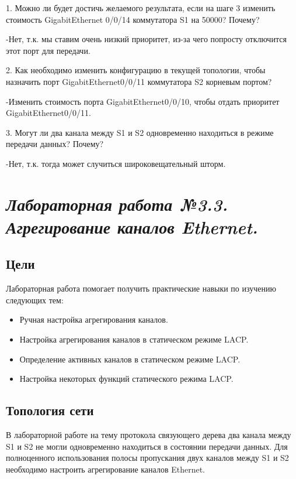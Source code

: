 1. Можно ли будет достичь желаемого результата, если на шаге 3 изменить
стоимость GigabitEthernet 0/0/14 коммутатора S1 на 50000? Почему?

-Нет, т.к. мы ставим очень низкий приоритет, из-за чего попросту отключится этот порт для передачи.

2. Как необходимо изменить конфигурацию в текущей топологии, чтобы назначить
порт GigabitEthernet0/0/11 коммутатора S2 корневым портом?

-Изменить стоимость порта GigabitEthernet0/0/10, чтобы отдать приоритет GigabitEthernet0/0/11.

3. Могут ли два канала между S1 и S2 одновременно находиться в режиме передачи
данных? Почему?

-Нет, т.к. тогда может случиться широковещательный шторм.

\section{\textit{Лабораторная работа №3.3. Агрегирование каналов Ethernet.}}

\subsection{Цели}

Лабораторная работа помогает получить практические навыки по изучению
следующих тем:

\begin{itemize}

\item Ручная настройка агрегирования каналов.

\item Настройка агрегирования каналов в статическом режиме LACP.

\item Определение активных каналов в статическом режиме LACP.

\item Настройка некоторых функций статического режима LACP.

\end{itemize}

\subsection{Топология сети}

В лабораторной работе на тему протокола связующего дерева два канала между S1 и
S2 не могли одновременно находиться в состоянии передачи данных. Для
полноценного использования полосы пропускания двух каналов между S1 и S2
необходимо настроить агрегирование каналов Ethernet.

